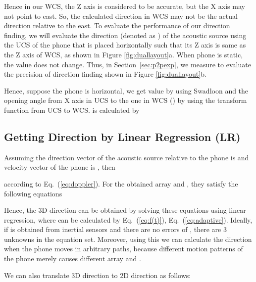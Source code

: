 \documentclass[]{sig-alternate-10pt}
\newcommand{\MYCUT}[1]{{ }}
\newcommand{\eqqref}[1]{Eq.~(\ref{#1})}
\def \ourprotocol{Swadloon\xspace}
\begin{document}
Hence in our WCS, the Z axis is  considered to be accurate, but the X
 axis may not point to east.
So, the calculated direction  in WCS may not be the actual
 direction relative  to the east.
To evaluate the performance of our direction finding,
 we will evaluate the direction (denoted as ) of the
 acoustic source using the UCS
 of the phone that is placed horizontally such that its Z axis is same
 as the Z axis of WCS, as shown in
 Figure  \ref{fig:duallayout}a.
When phone is static, the value  does not change.
Thus, in Section~\ref{sec:p2pexp}, we measure  to evaluate the
 precision of direction finding shown in Figure \ref{fig:duallayout}b.


Hence, suppose the phone is horizontal, we
get value  by using \ourprotocol  and the opening angle from X axis in UCS to the one in WCS () by using the
transform function from UCS to WCS.  is calculated by


\subsection{Getting Direction by Linear Regression (LR)}

\MYCUT{In 3D world's coordinate system, where the X axis points toward East,
Y axis points to the North Pole, and Z axis points to the sky. In
this case,  is the direction in the projected 2D world's
coordinate system. }Assuming the direction vector of the acoustic
source relative to the phone is
 and
velocity vector of the phone is , then

according to \eqqref{eq:doppler}.
For the obtained array  and , they
satisfy the following equations

Hence, the 3D direction  can be obtained by
solving these equations  using linear regression,
where  can be calculated by \eqqref{eq:f(t)}, \eqqref{eq:adaptive}.
Ideally, if  is obtained from inertial sensors and
there are no errors of , there are 3 unknowns
 in the equation set.
Moreover, using this we can calculate the direction
 when  the phone moves in arbitrary paths,
 because different motion patterns of the phone
 merely causes different array
  and .

We can also translate 3D direction  to 2D direction  as follows:
\end{document}
